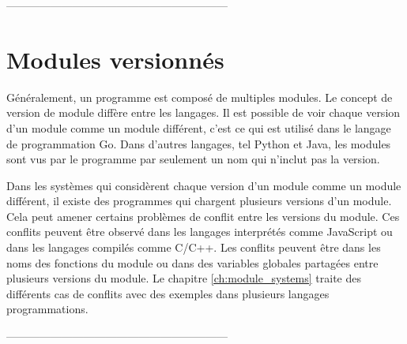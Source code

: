 ------------------------------------------------------------

\section{Modules versionnés}
%
Généralement, un programme est composé de multiples modules.
Le concept de version de
module diffère entre les langages. Il est possible de voir chaque version d'un
module comme un module différent, c'est ce qui est utilisé dans le langage de programmation Go. Dans d'autres langages,
tel Python et Java, les modules sont vus par le programme par seulement
un nom qui n'inclut pas la version.

Dans les systèmes qui considèrent chaque version d'un module comme un module différent,
il existe des programmes qui chargent plusieurs versions d'un module. Cela peut amener
certains problèmes de conflit entre les versions du module. Ces conflits peuvent être
observé dans les langages interprétés comme JavaScript ou dans les langages compilés
comme C/C++. Les conflits peuvent être dans les noms des fonctions du module ou
dans des variables globales partagées entre plusieurs versions du module. Le chapitre
\ref{ch:module_systems} traite des différents cas de conflits avec des exemples
dans plusieurs langages programmations.


------------------------------------------------------------







